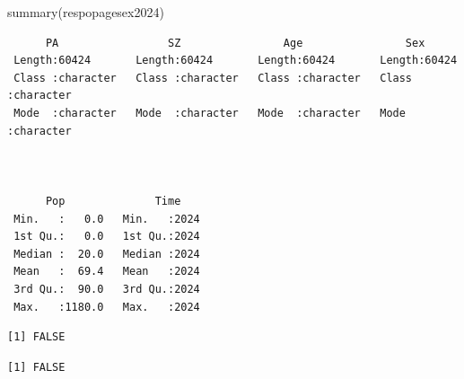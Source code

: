 \documentclass[
  letterpaper,
  DIV=11,
  numbers=noendperiod]{scrartcl}
\newenvironment{Shaded}{\begin{snugshade}}{\end{snugshade}}
\newcommand{\FunctionTok}[1]{\textcolor[rgb]{0.28,0.35,0.67}{#1}}
\newcommand{\NormalTok}[1]{\textcolor[rgb]{0.00,0.23,0.31}{#1}}
\newcommand{\SpecialCharTok}[1]{\textcolor[rgb]{0.37,0.37,0.37}{#1}}
\newcommand{\StringTok}[1]{\textcolor[rgb]{0.13,0.47,0.30}{#1}}
\begin{document}
\begin{Shaded}
\begin{Highlighting}[]
\FunctionTok{summary}\NormalTok{(respopagesex2024)}
\end{Highlighting}
\end{Shaded}

\begin{verbatim}
      PA                 SZ                Age                Sex           
 Length:60424       Length:60424       Length:60424       Length:60424      
 Class :character   Class :character   Class :character   Class :character  
 Mode  :character   Mode  :character   Mode  :character   Mode  :character  
                                                                            
                                                                            
                                                                            
      Pop              Time     
 Min.   :   0.0   Min.   :2024  
 1st Qu.:   0.0   1st Qu.:2024  
 Median :  20.0   Median :2024  
 Mean   :  69.4   Mean   :2024  
 3rd Qu.:  90.0   3rd Qu.:2024  
 Max.   :1180.0   Max.   :2024  
\end{verbatim}

\begin{Shaded}
\end{Shaded}

\begin{verbatim}
[1] FALSE
\end{verbatim}

\begin{Shaded}
\end{Shaded}

\begin{verbatim}
[1] FALSE
\end{verbatim}

\begin{Shaded}
\end{Shaded}
\end{document}
